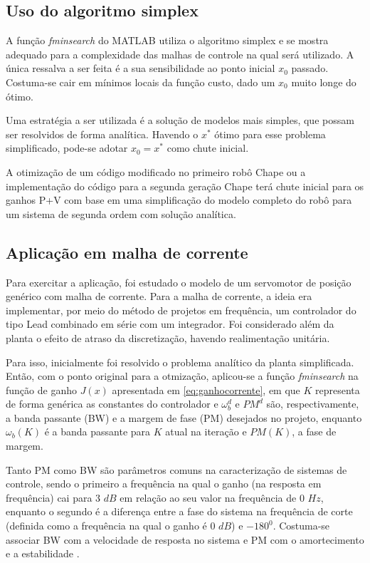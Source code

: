 \subsection{Uso do algoritmo simplex}

A função \textit{fminsearch} do MATLAB utiliza o algoritmo simplex e se mostra adequado para a complexidade das malhas de controle na qual será utilizado. A única ressalva a ser feita é a sua sensibilidade ao ponto inicial $x_0$ passado. Costuma-se cair em mínimos locais da função custo, dado um $x_0$ muito longe do ótimo.

Uma estratégia a ser utilizada é a solução de modelos mais simples, que possam ser resolvidos de forma analítica. Havendo o $x^*$ ótimo para esse problema simplificado, pode-se adotar $x_0 = x^*$ como chute inicial.

A otimização de um código modificado no primeiro robô Chape ou a implementação do código para a segunda geração Chape terá chute inicial para os ganhos P+V com base em uma simplificação do modelo completo do robô para um sistema de segunda ordem com solução analítica.

\subsection{Aplicação em malha de corrente}
\label{sec:malha}
Para exercitar a aplicação, foi estudado o modelo de um servomotor de posição genérico \cite{max27} com malha de corrente. Para a malha de corrente, a ideia era implementar, por meio do método de projetos em frequência, um controlador do tipo Lead combinado em série com um integrador. Foi considerado além da planta o efeito de atraso da discretização, havendo realimentação unitária.

Para isso, inicialmente foi resolvido o problema analítico da planta simplificada. Então, com o ponto original para a otmização, aplicou-se a função \textit{fminsearch} na função de ganho $J(x)$ apresentada em \eqref{eq:ganhocorrente}, em que $K$ representa de forma genérica as constantes do controlador e $\omega_b^d$ e $PM^d$ são, respectivamente, a banda passante (BW) e a margem de fase (PM) desejados no projeto, enquanto $\omega_b(K)$ é a banda passante para $K$ atual na iteração  e $PM(K)$, a fase de margem. 

Tanto PM como BW são parâmetros comuns na caracterização de sistemas de controle, sendo o primeiro a frequência na qual o ganho (na resposta em frequência) cai para $3$ $dB$ em relação ao seu valor na frequência de $0$ $Hz$, enquanto o segundo é a diferença entre a fase do sistema na frequência de corte (definida como a frequência na qual o ganho é $0$ $dB$) e $-180^0$. Costuma-se associar BW com a velocidade de resposta no sistema e PM com o amortecimento e a estabilidade \cite{ogata2010}. 

